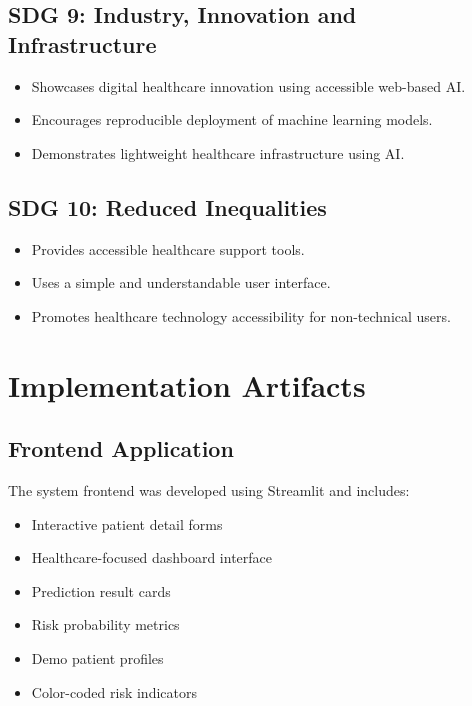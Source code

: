 \documentclass[12pt]{article}
\begin{document}
\subsection*{SDG 9: Industry, Innovation and Infrastructure}

\begin{itemize}
    \item Showcases digital healthcare innovation using accessible web-based AI.
    \item Encourages reproducible deployment of machine learning models.
    \item Demonstrates lightweight healthcare infrastructure using AI.
\end{itemize}

\subsection*{SDG 10: Reduced Inequalities}

\begin{itemize}
    \item Provides accessible healthcare support tools.
    \item Uses a simple and understandable user interface.
    \item Promotes healthcare technology accessibility for non-technical users.
\end{itemize}

\section*{Implementation Artifacts}

\subsection*{Frontend Application}

The system frontend was developed using Streamlit and includes:

\begin{itemize}
    \item Interactive patient detail forms
    \item Healthcare-focused dashboard interface
    \item Prediction result cards
    \item Risk probability metrics
    \item Demo patient profiles
    \item Color-coded risk indicators
\end{itemize}
\end{document}
